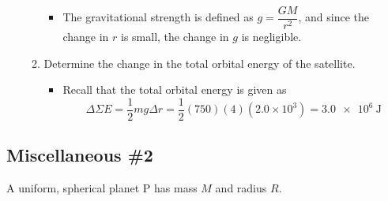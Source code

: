 \documentclass[a4paper,12pt]{article}
\begin{document}
\begin{enumerate}[label=(\alph*)]
\begin{enumerate}[label=(\roman*)]
\begin{itemize}
                  \item The gravitational strength is defined as $g = \dfrac{GM}{r^2}$, and since the change in $r$ is small, the change in $g$ is negligible.
                \end{itemize}
          \item Determine the change in the total orbital energy of the satellite.
                \begin{itemize}
                  \item Recall that the total orbital energy is given as $$\Delta \Sigma E = \dfrac{1}{2}mg\Delta r = \frac{1}{2}(750)(4)(2.0\times 10^3) = \SI{3.0e6}{\joule}$$
                \end{itemize}
        \end{enumerate}
\end{enumerate}

\pagebreak

\subsection{Miscellaneous \#2}

A uniform, spherical planet P has mass $M$ and radius $R$.
\end{document}
